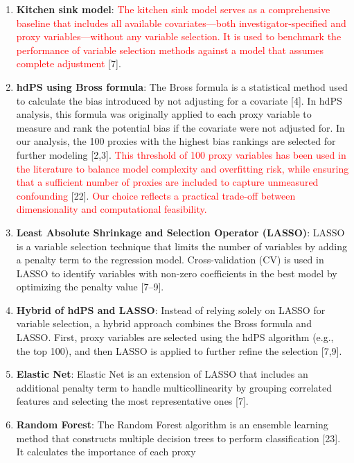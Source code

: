\documentclass[10pt,letterpaper]{article}
\begin{document}
\begin{enumerate}
\def\labelenumi{\arabic{enumi}.}
\item
  \textbf{Kitchen sink model}:
  \textcolor{red}{The kitchen sink model serves as a comprehensive baseline that includes all available covariates—both investigator-specified and proxy variables—without any variable selection. It is used to benchmark the performance of variable selection methods against a model that assumes complete adjustment}
  {[}7{]}.
\item
  \textbf{hdPS using Bross formula}: The Bross formula is a statistical
  method used to calculate the bias introduced by not adjusting for a
  covariate {[}4{]}. In hdPS analysis, this formula was originally
  applied to each proxy variable to measure and rank the potential bias
  if the covariate were not adjusted for. In our analysis, the 100
  proxies with the highest bias rankings are selected for further
  modeling {[}2,3{]}.
  \textcolor{red}{This threshold of 100 proxy variables has been used in the literature to balance model complexity and overfitting risk, while ensuring that a sufficient number of proxies are included to capture unmeasured confounding}
  {[}22{]}.
  \textcolor{red}{Our choice reflects a practical trade-off between dimensionality and computational feasibility.}
\item
  \textbf{Least Absolute Shrinkage and Selection Operator (LASSO)}:
  LASSO is a variable selection technique that limits the number of
  variables by adding a penalty term to the regression model.
  Cross-validation (CV) is used in LASSO to identify variables with
  non-zero coefficients in the best model by optimizing the penalty
  value {[}7--9{]}.
\item
  \textbf{Hybrid of hdPS and LASSO}: Instead of relying solely on LASSO
  for variable selection, a hybrid approach combines the Bross formula
  and LASSO. First, proxy variables are selected using the hdPS
  algorithm (e.g., the top 100), and then LASSO is applied to further
  refine the selection {[}7,9{]}.
\item
  \textbf{Elastic Net}: Elastic Net is an extension of LASSO that
  includes an additional penalty term to handle multicollinearity by
  grouping correlated features and selecting the most representative
  ones {[}7{]}.
\item
  \textbf{Random Forest}: The Random Forest algorithm is an ensemble
  learning method that constructs multiple decision trees to perform
  classification {[}23{]}. It calculates the importance of each proxy

\end{enumerate}
\end{document}
